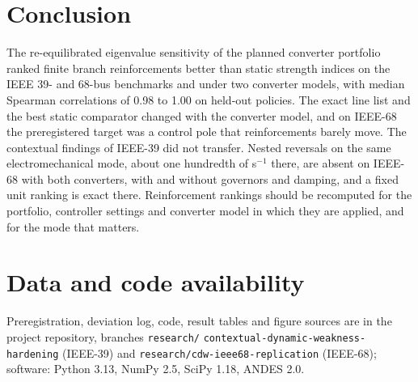 \documentclass[journal]{IEEEtran}
\theoremstyle{remark}
\begin{document}
\section{Conclusion}
The re-equilibrated eigenvalue sensitivity of the planned converter portfolio
ranked finite branch reinforcements better than static strength indices on the
IEEE 39- and 68-bus benchmarks and under two converter models, with median
Spearman correlations of 0.98 to 1.00 on held-out policies. The exact line list and
the best static comparator changed with the converter model, and on IEEE-68 the
preregistered target was a control pole that reinforcements barely move. The
contextual findings of IEEE-39 did not transfer. Nested reversals on the same
electromechanical mode, about one hundredth of s$^{-1}$ there, are absent on
IEEE-68 with both converters, with and without governors and damping, and a fixed
unit ranking is exact there. Reinforcement rankings should be recomputed for the
portfolio, controller settings and converter model in which they are applied, and
for the mode that matters.

\section*{Data and code availability}
Preregistration, deviation log, code, result tables and figure sources are in the
project repository, branches \texttt{research/}\allowbreak
\texttt{contextual-dynamic-weakness-hardening} (IEEE-39) and
\texttt{research/}\allowbreak\texttt{cdw-ieee68-replication} (IEEE-68);
software: Python 3.13, NumPy 2.5, SciPy 1.18, ANDES 2.0.



\end{document}
